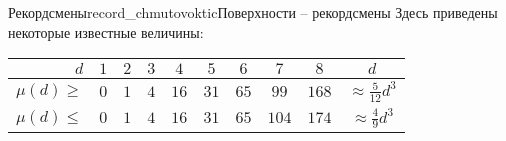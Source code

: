 \begin{surferIntroPage}{Рекордсмены}{record_chmutovoktic}{Поверхности – рекордсмены}
Здесь приведены некоторые известные величины:
    \begin{center}
      \begin{tabular}{r|cccccccc|c}
        $d$ & $1$ & $2$ & $3$ & $4$ & $5$ & $6$ & $7$ & $8$ & $d$\\
        \hline
        \hline
        \rule{0pt}{1.2em}$\mu(d)\ge$ & $0$ & $1$ & $4$ & $16$ & $31$ & $65$ &
        $99$ & $168$ & 
        $\approx \frac{5}{12}d^3$\\[0.3em]
        \hline
        \rule{0pt}{1.2em}$\mu(d)\le$ & $0$ & $1$ & $4$ & $16$ & $31$ & $65$ &
        $104$ & $174$ & $\approx \frac{4}{9}d^3$
      \end{tabular}
    \end{center}
\end{surferIntroPage}
